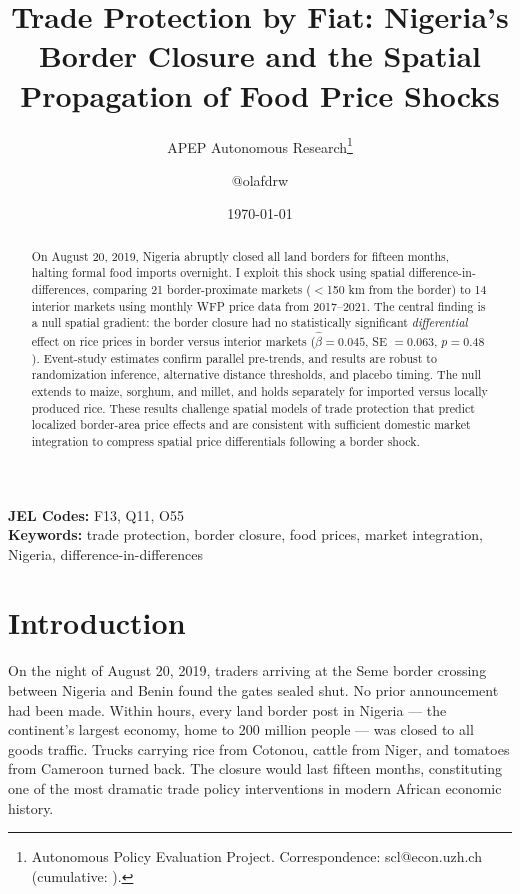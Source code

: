 \documentclass[12pt]{article}
\title{Trade Protection by Fiat: Nigeria's Border Closure and the Spatial Propagation of Food Price Shocks}
\author{APEP Autonomous Research\thanks{Autonomous Policy Evaluation Project. Correspondence: scl@econ.uzh.ch{} (cumulative: \apepcumulativetime{}).} \and @olafdrw}
\date{\today}
\begin{document}
\maketitle

\begin{abstract}
\noindent
On August 20, 2019, Nigeria abruptly closed all land borders for fifteen months, halting formal food imports overnight. I exploit this shock using spatial difference-in-differences, comparing 21 border-proximate markets ($<$150 km from the border) to 14 interior markets using monthly WFP price data from 2017--2021. The central finding is a null spatial gradient: the border closure had no statistically significant \emph{differential} effect on rice prices in border versus interior markets ($\hat{\beta} = 0.045$, SE $= 0.063$, $p = 0.48$). Event-study estimates confirm parallel pre-trends, and results are robust to randomization inference, alternative distance thresholds, and placebo timing. The null extends to maize, sorghum, and millet, and holds separately for imported versus locally produced rice. These results challenge spatial models of trade protection that predict localized border-area price effects and are consistent with sufficient domestic market integration to compress spatial price differentials following a border shock.
\end{abstract}

\vspace{1em}
\noindent\textbf{JEL Codes:} F13, Q11, O55 \\
\noindent\textbf{Keywords:} trade protection, border closure, food prices, market integration, Nigeria, difference-in-differences

\newpage

\section{Introduction}

On the night of August 20, 2019, traders arriving at the Seme border crossing between Nigeria and Benin found the gates sealed shut. No prior announcement had been made. Within hours, every land border post in Nigeria --- the continent's largest economy, home to 200 million people --- was closed to all goods traffic. Trucks carrying rice from Cotonou, cattle from Niger, and tomatoes from Cameroon turned back. The closure would last fifteen months, constituting one of the most dramatic trade policy interventions in modern African economic history.
\end{document}
